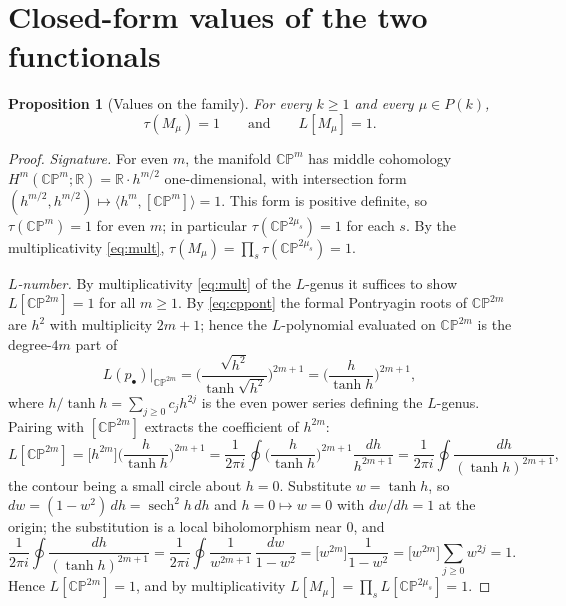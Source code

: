 \documentclass[12pt]{article}
\newtheorem{proposition}{Proposition}
\theoremstyle{definition}
\begin{document}
\bigskip

\section{Closed-form values of the two functionals}

\begin{proposition}[Values on the family]\label{prop:values}
For every $k\ge 1$ and every $\mu\in P(k)$,
\[
\tau(M_\mu)=1
\qquad\text{and}\qquad
L[M_\mu]=1.
\]
\end{proposition}

\begin{proof}
\emph{Signature.}  For even $m$, the manifold $\mathbb{CP}^{m}$ has middle cohomology
$H^{m}(\mathbb{CP}^{m};\mathbb{R})=\mathbb{R}\cdot h^{m/2}$ one-dimensional, with
intersection form $(h^{m/2},h^{m/2})\mapsto\langle h^{m},[\mathbb{CP}^{m}]\rangle=1$.
This form is positive definite, so $\tau(\mathbb{CP}^{m})=1$ for even $m$; in particular
$\tau(\mathbb{CP}^{2\mu_s})=1$ for each $s$.  By the multiplicativity
\eqref{eq:mult}, $\tau(M_\mu)=\prod_s\tau(\mathbb{CP}^{2\mu_s})=1$.

\emph{$L$-number.}  By multiplicativity \eqref{eq:mult} of the $L$-genus it suffices to
show $L[\mathbb{CP}^{2m}]=1$ for all $m\ge 1$.  By \eqref{eq:cppont} the formal
Pontryagin roots of $\mathbb{CP}^{2m}$ are $h^2$ with multiplicity $2m+1$; hence the
$L$-polynomial evaluated on $\mathbb{CP}^{2m}$ is the degree-$4m$ part of
\[
L(p_\bullet)\Big|_{\mathbb{CP}^{2m}}
=\Big(\frac{\sqrt{h^2}}{\tanh\sqrt{h^2}}\Big)^{2m+1}
=\Big(\frac{h}{\tanh h}\Big)^{2m+1},
\]
where $h/\tanh h=\sum_{j\ge 0}c_j h^{2j}$ is the even power series defining the $L$-genus.
Pairing with $[\mathbb{CP}^{2m}]$ extracts the coefficient of $h^{2m}$:
\[
L[\mathbb{CP}^{2m}]=\big[h^{2m}\big]\Big(\frac{h}{\tanh h}\Big)^{2m+1}
=\frac{1}{2\pi i}\oint \Big(\frac{h}{\tanh h}\Big)^{2m+1}\frac{dh}{h^{2m+1}}
=\frac{1}{2\pi i}\oint\frac{dh}{(\tanh h)^{2m+1}},
\]
the contour being a small circle about $h=0$.  Substitute $w=\tanh h$, so
$dw=(1-w^2)\,dh=\operatorname{sech}^2 h\,dh$ and $h=0\mapsto w=0$ with $dw/dh=1$ at the
origin; the substitution is a local biholomorphism near $0$, and
\[
\frac{1}{2\pi i}\oint\frac{dh}{(\tanh h)^{2m+1}}
=\frac{1}{2\pi i}\oint\frac{1}{w^{2m+1}}\,\frac{dw}{1-w^2}
=\big[w^{2m}\big]\frac{1}{1-w^2}
=\big[w^{2m}\big]\sum_{j\ge0}w^{2j}=1.
\]
Hence $L[\mathbb{CP}^{2m}]=1$, and by multiplicativity
$L[M_\mu]=\prod_s L[\mathbb{CP}^{2\mu_s}]=1$.
\end{proof}
\end{document}
